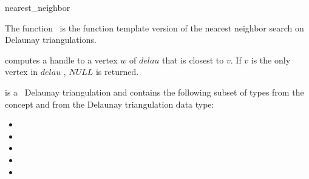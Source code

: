 \begin{ccRefFunction}{nearest_neighbor}

\ccDefinition

The function \ccRefName\ is the function template version of the nearest neighbor search on Delaunay
triangulations.
  



{computes a handle to a vertex $w$ of $delau$ that is closest to $v$.
If $v$ is the only vertex in $delau$ , $NULL$ is returned. }


 is a \cgal\ Delaunay triangulation and contains the following subset of types from the concept  and from
the Delaunay triangulation data type:
\begin{itemize}
  \item {}
  \item {}                 
  \item {}            
  \item {}             
  \item {}          
\end{itemize}
\end{ccRefFunction}



